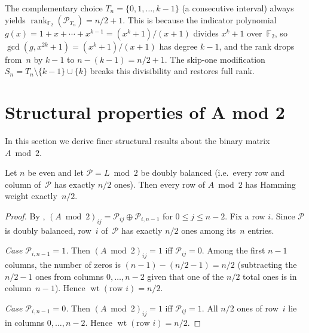 \documentclass[11pt,a4paper]{article}
\newcommand{\FF}{\mathbb{F}}
\newcommand{\rank}{\operatorname{rank}}
\newcommand{\wt}{\operatorname{wt}}
\begin{document}
\begin{remark}\label{rem:consecutive}
The complementary choice $T_n=\{0,1,\dots,k-1\}$ (a consecutive
interval) always yields $\rank_{\FF_2}(\mathcal{P}_{T_n})=n/2+1$.
This is because
the indicator polynomial $g(x)=1+x+\cdots+x^{k-1}=(x^k+1)/(x+1)$
divides $x^k+1$ over~$\FF_2$, so
$\gcd(g,x^{2k}+1)=(x^k+1)/(x+1)$ has degree $k-1$, and the rank
drops from~$n$ by $k-1$ to $n-(k-1)=n/2+1$.  The skip-one
modification $S_n=T_n\setminus\{k-1\}\cup
\{k\}$ breaks this divisibility and restores full rank.
\end{remark}

\section{Structural properties of A mod 2}\label{sec:structure}

In this section we derive finer structural results about the binary
matrix $A\bmod 2$.

\begin{theorem}\label{thm:row-weight}
Let $n$ be even and let $\mathcal{P}=L\bmod 2$ be doubly balanced
(i.e.\ every row and column of~$\mathcal{P}$ has exactly $n/2$ ones).
Then every row of $A\bmod 2$ has Hamming weight exactly~$n/2$.
\end{theorem}

\begin{proof}
By , $(A\bmod 2)_{ij}=\mathcal{P}_{ij}\oplus\mathcal{P}_{i,n-1}$
for $0\le j\le n-2$.  Fix a row $i$.  Since $\mathcal{P}$ is doubly
balanced, row~$i$ of~$\mathcal{P}$ has exactly $n/2$ ones among
its~$n$ entries.

\smallskip\noindent
\emph{Case $\mathcal{P}_{i,n-1}=1$.}  Then $(A\bmod 2)_{ij}=1$ iff
$\mathcal{P}_{ij}=0$.  Among the first $n-1$ columns, the number of zeros
is $(n-1)-(n/2-1)=n/2$ (subtracting the $n/2-1$ ones from columns
$0,\dots,n-2$ given that one of the $n/2$ total ones is in column~$n-1$).
Hence $\wt(\text{row }i)=n/2$.

\smallskip\noindent
\emph{Case $\mathcal{P}_{i,n-1}=0$.}  Then $(A\bmod 2)_{ij}=1$ iff
$\mathcal{P}_{ij}=1$.  All $n/2$ ones of row~$i$ lie in columns
$0,\dots,n-2$.  Hence $\wt(\text{row }i)=n/2$.
\end{proof}
\end{document}
